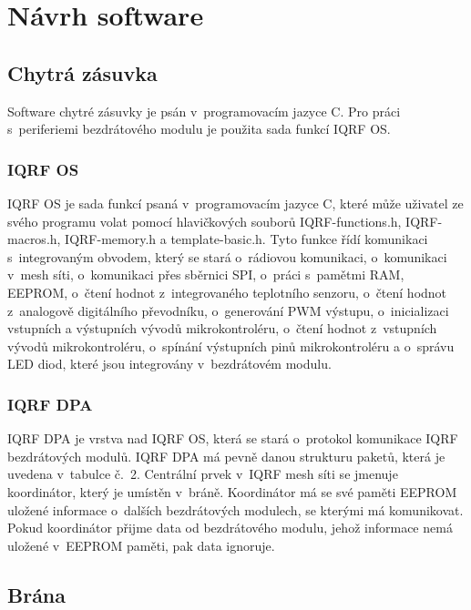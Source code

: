 \documentclass[12pt,a4paper,oneside]{article}
\begin{document}
\newpage

\section{Návrh software}

\subsection{Chytrá zásuvka}

Software chytré zásuvky je psán v~programovacím jazyce C. Pro práci s~periferiemi bezdrátového modulu je použita sada funkcí IQRF OS. 

\subsubsection{IQRF OS}

IQRF OS je sada funkcí psaná v~programovacím jazyce C, které může uživatel ze svého programu volat pomocí hlavičkových souborů IQRF-functions.h, IQRF-macros.h, IQRF-memory.h a template-basic.h. Tyto funkce řídí komunikaci s~integrovaným obvodem, který se stará o~rádiovou komunikaci, o~komunikaci v~mesh síti, o~komunikaci přes sběrnici SPI, o~práci s~pamětmi RAM, EEPROM, o~čtení hodnot z~integrovaného teplotního senzoru, o~čtení hodnot z~analogově digitálního převodníku, o~generování PWM výstupu, o~inicializaci vstupních a výstupních vývodů mikrokontroléru, o~čtení hodnot z~vstupních vývodů mikrokontroléru, o~spínání výstupních pinů mikrokontroléru a o~správu LED diod, které jsou integrovány v~bezdrátovém modulu. 

\subsubsection{IQRF DPA}

IQRF DPA je vrstva nad IQRF OS, která se stará o~protokol komunikace IQRF bezdrátových modulů. IQRF DPA má pevně danou strukturu paketů, která je uvedena v~tabulce č.~2. Centrální prvek v~IQRF mesh síti se jmenuje koordinátor, který je umístěn v~bráně. Koordinátor má se své paměti EEPROM uložené informace o~dalších bezdrátových modulech, se kterými má komunikovat. Pokud koordinátor přijme data od bezdrátového modulu, jehož informace nemá uložené v~EEPROM paměti, pak data ignoruje.

\subsection{Brána}
\end{document}
